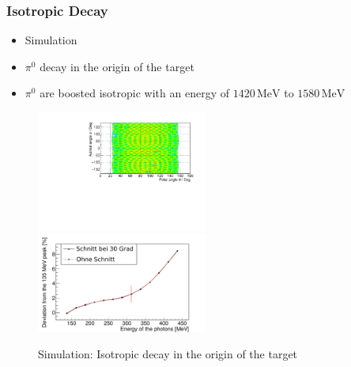 \documentclass[slidestop,compress,mathserif]{beamer}
\begin{document}
\begin{frame}
	\frametitle{Isotropic Decay}
	\begin{itemize}
		\item Simulation
		\item $\pi^0$ decay in the origin of the target
		\item $\pi^0$ are boosted isotropic with an energy of $ 1420\, \text{MeV}$ to $1580\, \text{MeV}$
	\end{itemize}
	
	\begin{figure}
		\includegraphics[width=0.50\textwidth]{Pictures/20171204DistributionPhotonUrsprungIsotrop}
		\includegraphics[width=0.50\textwidth]{Pictures/20172804IsotropUrpsprungDeviation}
		\caption{Simulation: Isotropic decay in the origin of the target}
	\end{figure}
\end{frame}
\end{document}

